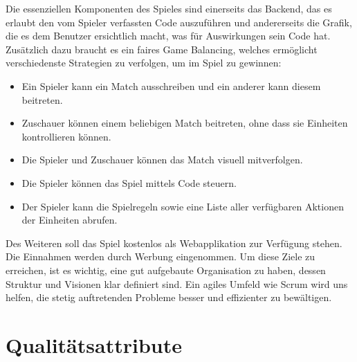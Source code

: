 \documentclass[a4paper, 11pt]{scrartcl}
\let\oldsection\section
\renewcommand\section{\clearpage\oldsection}
\begin{document}
Die essenziellen Komponenten des Spieles sind einerseits das Backend, das es erlaubt den vom Spieler verfassten Code auszuführen und andererseits die Grafik, die es dem Benutzer ersichtlich macht, was für Auswirkungen sein Code hat. Zusätzlich dazu braucht es ein faires Game Balancing, welches ermöglicht verschiedenste Strategien zu verfolgen, um im Spiel zu gewinnen:

\begin{itemize}
  \item Ein Spieler kann ein Match ausschreiben und ein anderer kann diesem beitreten.
  \item Zuschauer können einem beliebigen Match beitreten, ohne dass sie Einheiten kontrollieren können.
  \item Die Spieler und Zuschauer können das Match visuell mitverfolgen.
  \item Die Spieler können das Spiel mittels Code steuern.
  \item Der Spieler kann die Spielregeln sowie eine Liste aller verfügbaren Aktionen der Einheiten abrufen.
\end{itemize}

Des Weiteren soll das Spiel kostenlos als Webapplikation zur Verfügung stehen. Die Einnahmen werden durch Werbung eingenommen.
Um diese Ziele zu erreichen, ist es wichtig, eine gut aufgebaute Organisation zu haben, dessen Struktur und Visionen klar definiert sind. Ein agiles Umfeld wie Scrum wird uns helfen, die stetig auftretenden Probleme
besser und effizienter zu bewältigen.

\section{Qualitätsattribute}
\end{document}
